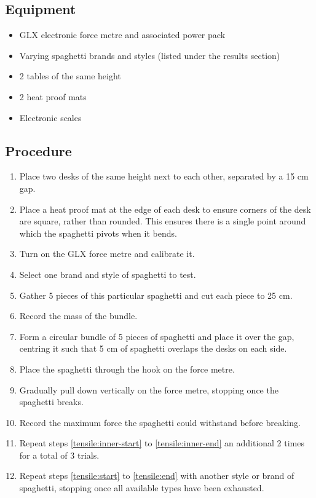 \documentclass[a4paper,11pt]{article}
\begin{document}
\subsection{Equipment}

\begin{itemize}
\item GLX electronic force metre and associated power pack
\item Varying spaghetti brands and styles (listed under the results section)
\item 2 tables of the same height
\item 2 heat proof mats
\item Electronic scales
\end{itemize}


\subsection{Procedure}

\begin{enumerate}
\item Place two desks of the same height next to each other, separated by a 15
	cm gap.
\item Place a heat proof mat at the edge of each desk to ensure corners of the
	desk are square, rather than rounded. This ensures there is a single
	point around which the spaghetti pivots when it bends.
\item Turn on the GLX force metre and calibrate it.
\item \label{tensile:start} Select one brand and style of spaghetti to test.
\item \label{tensile:inner-start} Gather 5 pieces of this particular spaghetti
	and cut each piece to 25 cm.
\item Record the mass of the bundle.
\item Form a circular bundle of 5 pieces of spaghetti and place it over the gap,
	centring it such that 5 cm of spaghetti overlaps the desks on each side.
\item Place the spaghetti through the hook on the force metre.
\item Gradually pull down vertically on the force metre, stopping once the
	spaghetti breaks.
\item \label{tensile:inner-end} Record the maximum force the spaghetti could
	withstand before breaking.
\item \label{tensile:end} Repeat steps \ref{tensile:inner-start} to
	\ref{tensile:inner-end} an additional 2 times for a total of 3 trials.
\item Repeat steps \ref{tensile:start} to \ref{tensile:end} with another
	style or brand of spaghetti, stopping once all available types have been
	exhausted.
\end{enumerate}
\end{document}
